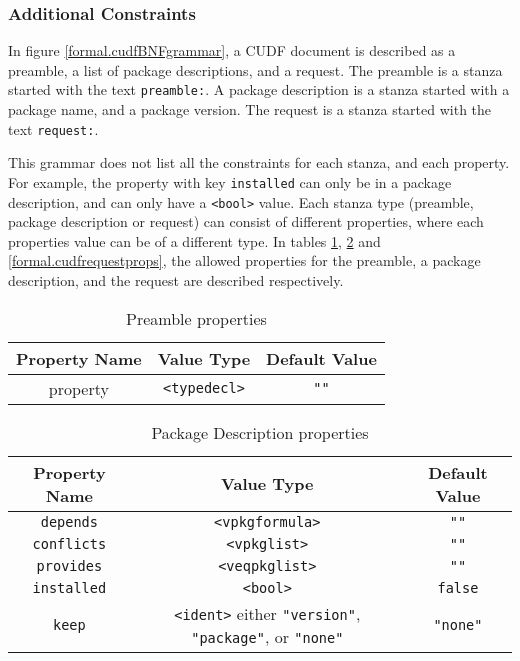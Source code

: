 \subsubsection{Additional Constraints}
In figure \ref{formal.cudfBNFgrammar}, a CUDF document is described as a preamble, a list of package descriptions, and a request.
The preamble is a stanza started with the text \verb+preamble:+.
A package description is a stanza started with a package name, and a package version.
The request is a stanza started with the text \verb+request:+.

This grammar does not list all the constraints for each stanza, and each property.
For example, the property with key \verb+installed+ can only be in a package description, and can only have a \verb+<bool>+ value.
Each stanza type (preamble, package description or request) can consist of different properties, where each properties value can be of a different type.
In tables \ref{formal.cudfpremableprops}, \ref{formal.cudfpdprops} and \ref{formal.cudfrequestprops}, 
the allowed properties for the preamble, a package description, and the request are described respectively.

\begin{table}
\begin{tabular}{|c|c|c|}
Property Name & Value Type & Default Value \\ \hline
property & \verb+<typedecl>+ & \verb+""+
\end{tabular}
\caption{Preamble properties}
\label{formal.cudfpremableprops}
\end{table}

\begin{table}
\begin{tabular}{|c|c|c|}
Property Name & Value Type & Default Value \\ \hline
\texttt{depends} & \texttt{<vpkgformula>} & \verb+""+ \\
\texttt{conflicts} & \texttt{<vpkglist>} & \verb+""+ \\ 
\texttt{provides} & \texttt{<veqpkglist>} & \verb+""+ \\ 
\texttt{installed} & \texttt{<bool>} & \verb+false+ \\ 
\texttt{keep} & \texttt{<ident>} either \texttt{"version"}, \texttt{"package"}, or \texttt{"none"} & \texttt{"none"} \\ 
\end{tabular}
\caption{Package Description properties}
\label{formal.cudfpdprops}
\end{table}

